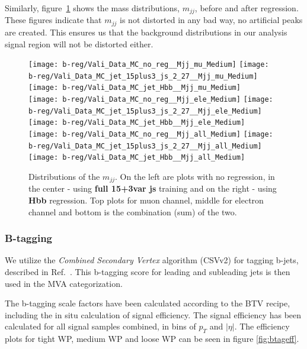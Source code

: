 Similarly, figure~\ref{fig:vali-Mjj} shows the mass distributions,
$m_{jj}$, before and after regression. These figures indicate that
$m_{jj}$ is not distorted in any bad way, no artificial peaks are
created. This ensures us that the background distributions in our
analysis signal region will not be distorted either.


\begin{figure}[thb]
  \centering
  \texttt{[image: b-reg/Vali\_Data\_MC\_no\_reg\_\_Mjj\_mu\_Medium]}\hfil
  \texttt{[image: b-reg/Vali\_Data\_MC\_jet\_15plus3\_js\_2\_27\_\_Mjj\_mu\_Medium]}\hfil
  \texttt{[image: b-reg/Vali\_Data\_MC\_jet\_Hbb\_\_Mjj\_mu\_Medium]}\hfil\\
  \texttt{[image: b-reg/Vali\_Data\_MC\_no\_reg\_\_Mjj\_ele\_Medium]}\hfil
  \texttt{[image: b-reg/Vali\_Data\_MC\_jet\_15plus3\_js\_2\_27\_\_Mjj\_ele\_Medium]}\hfil
  \texttt{[image: b-reg/Vali\_Data\_MC\_jet\_Hbb\_\_Mjj\_ele\_Medium]}\hfil\\
  \texttt{[image: b-reg/Vali\_Data\_MC\_no\_reg\_\_Mjj\_all\_Medium]}\hfil
  \texttt{[image: b-reg/Vali\_Data\_MC\_jet\_15plus3\_js\_2\_27\_\_Mjj\_all\_Medium]}\hfil
  \texttt{[image: b-reg/Vali\_Data\_MC\_jet\_Hbb\_\_Mjj\_all\_Medium]}\hfil\\
  \caption{Distributions of the $m_{jj}$. On the left are plots with
    no regression, in the center - using \textbf{full 15+3var js}
    training and on the right - using \textbf{Hbb} regression.  Top
    plots for muon channel, middle for electron channel and bottom is
    the combination (sum) of the two.  }
  \label{fig:vali-Mjj}
\end{figure}

\clearpage

\subsubsection{B-tagging}
\label{sec:btag}

We utilize the \textit{Combined Secondary Vertex} algorithm (CSVv2) for tagging b-jets,
described in Ref.~\cite{btag-twiki}. This b-tagging score for leading and subleading jets is then used in the MVA categorization.

The b-tagging scale factors have been calculated according to the BTV recipe, including the in situ calculation of signal efficiency.
The signal efficiency has been calculated for all signal samples combined, in bins of $p_{T}$ and $|\eta|$.
The efficiency plots for tight WP, medium WP and loose WP can be seen in figure \ref{fig:btageff}.

